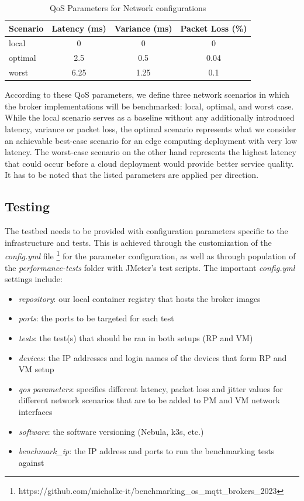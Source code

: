 \documentclass[conference]{IEEEtran}
\begin{document}
\begin{table}[htbp]
    \centering
    \caption{QoS Parameters for Network configurations}
    \label{tab:qos}
    \begin{tabular}{lccc}
        \toprule
        \textbf{Scenario} & \textbf{Latency (ms)} & \textbf{Variance (ms)} &\textbf{Packet Loss (\%)} \\
        \midrule
        local & 0 & 0 & 0 \\
        optimal & 2.5 & 0.5 & 0.04 \\
        worst & 6.25 & 1.25 & 0.1 \\
        \bottomrule
    \end{tabular}
\end{table}
According to these QoS parameters, we define three network scenarios in which the broker
implementations will be benchmarked: local, optimal, and worst case. While the local scenario serves
as a baseline without any additionally introduced latency, variance or packet loss, the optimal
scenario represents what we consider an achievable best-case scenario for an edge computing
deployment with very low latency. The worst-case scenario on the other hand represents the highest
latency that could occur before a cloud deployment would provide better service quality. It has to be
noted that the listed parameters are applied per direction.

\subsection{Testing}
The testbed needs to be provided with configuration parameters specific to the infrastructure and tests. This is achieved through the customization of the
\textit{config.yml} file
\footnote{https://github.com/michalke-it/benchmarking\_os\_mqtt\_brokers\_2023}
for the parameter configuration, as well as through population of the \textit{performance-tests} folder with JMeter's test scripts. The important \textit{config.yml} settings include:
\begin{itemize}
    \item \emph{repository}: our local container registry that hosts the broker images
    \item \emph{ports}: the ports to be targeted for each test  
    \item \emph{tests}: the test(s) that should be ran in both setups (RP and VM)
    \item \emph{devices}: the IP addresses and login names of the devices that form RP and VM setup
    \item \emph{qos parameters}: specifies different latency, packet loss and jitter values for
    different network scenarios that are to be added to PM and VM network interfaces
    \item \emph{software}: the software versioning (Nebula, k3s, etc.)
    \item \emph{benchmark\_ip}: the IP address and ports to run the benchmarking tests against
\end{itemize}
\end{document}
